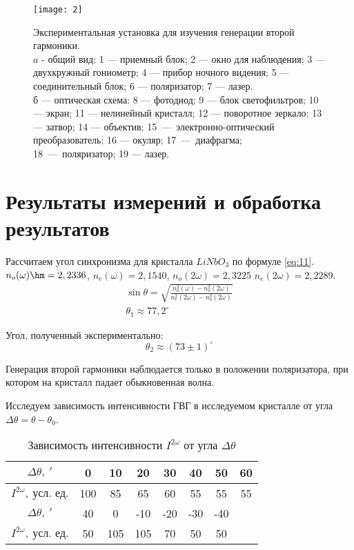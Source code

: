 \documentclass[a4paper, 12pt]{article}
\begin{document}
\begin{figure}[H]
    \texttt{[image: 2]} 
    \caption{Экспериментальная установка для изучения генерации второй
    гармоники.\\ $a$ - общий вид: 1 --- приемный блок; 2 --- окно для
наблюдения; 3 --- двухкружный гониометр; 4 --- прибор ночного
видения; 5 --- соединительный блок; 6 --- поляризатор; 7 --- лазер.\\
б --- оптическая схема: 8 --- фотодиод; 9 --- блок светофильтров; 10
--- экран; 11 --- нелинейный кристалл; 12 --- поворотное зеркало; 13
--- затвор; 14 --- объектив; 15~---~электронно-оптический
преобразователь; 16 --- окуляр; 17~---~диафрагма; 18~---~поляризатор;
19 --- лазер.}
    \label{fig:2}
\end{figure}






\section{Результаты измерений и обработка результатов}
Рассчитаем угол синхронизма для кристалла $LiNbO_3$ по формуле
\eqref{eq:11}. $n_o(\omega) \hm= 2,2336$, $n_e(\omega) = 2,1540$,
$n_o(2\omega) = 2,3225$ $n_e(2\omega) = 2,2289$.
\begin{equation*}
    \begin{gathered}
    \sin \theta = \sqrt{ \frac{n_o^2(\omega) -
    n_o^2(2\omega)}{n_e^2(2\omega) - n_o^2(2\omega)} }\\
    \theta_1 \approx 77,2^\circ 
    \end{gathered}
\end{equation*}

Угол, полученный экспериментально:
\[
    \theta_2 \approx (73 \pm 1)^\circ
\]

Генерация второй гармоники наблюдается только в положении
поляризатора, при котором на кристалл падает обыкновенная волна.

Исследуем зависимость интенсивности ГВГ в исследуемом кристалле от
угла $\Delta \theta = \theta - \theta_0$.

\renewcommand{\arraystretch}{1.3}

\begin{table}[H]
\centering
\begin{tabular}{|c|c|c|c|c|c|c|c|}
\hline
$\Delta \theta,\ '$ & 0            & 10  & 20  & 30  & 40  & 50  & 60 \\ \hline
$I ^{2\omega},\ \text{усл. ед.}$   & 100 & 85  & 65  & 60  & 55  & 55
& 55 \\ \hline \hline 
$\Delta \theta,\ '$        & 40  & 0   & -10 & -20 & -30 & -40
                           \multirow{2}{*}{}    \\ \cline{1-7}
$I ^{2\omega},\ \text{усл. ед.}$    & 50  & 105 & 105 & 70  & 50  & 50
    \\ \cline{1-7}
\end{tabular}
\caption{Зависимость интенсивности $I ^{2\omega}$ от угла $\Delta
\theta$}
\end{table}
\end{document}
